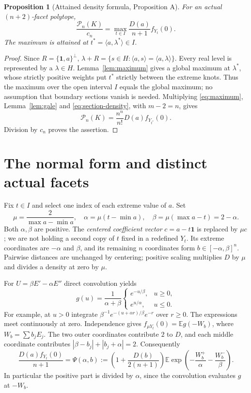 \documentclass[11pt]{article}
\newtheorem{proposition}[theorem]{Proposition}
\theoremstyle{remark}\newtheorem{remark}[theorem]{Remark}
\newcommand{\E}{\mathbb E}
\newcommand{\one}{\mathbf 1}
\newcommand{\PP}{\mathcal P}
\numberwithin{equation}{section}
\begin{document}
\begin{proposition}[Attained density formula, Proposition A]\label{prop:A}
For an actual $(n+2)$-facet polytope,
\begin{equation}\label{eq:A}
 \frac{\PP_n(K)}{c_n}
 =\max_{t\in I}\frac{D(a)}{n+1}f_{Y_t}(0).
\end{equation}
The maximum is attained at $t^*=\langle a,\lambda^*\rangle\in I$.
\end{proposition}
\begin{proof}
Since $R=\{\one,a\}^\perp$,
$\lambda+R=\{s\in H:\langle a,s\rangle=\langle a,\lambda\rangle\}$.
Every real level is represented by a $\lambda\in H$.
Lemma~\ref{lem:maximum} gives a global maximum at $\lambda^*$, whose
strictly positive weights put $t^*$ strictly between the extreme knots.
Thus the maximum over the open interval $I$ equals the global maximum;
no assumption that boundary sections vanish is needed.
Multiplying \eqref{eq:maximum}, Lemma~\ref{lem:gale} and
\eqref{eq:section-density}, with $m-2=n$, gives
\[
 \PP_n(K)=\frac{n^n}{n!}D(a)f_{Y_{t^*}}(0).
\]
Division by $c_n$ proves the assertion.
\end{proof}

\section{The normal form and distinct actual facets}\label{sec:normal}
Fix $t\in I$ and select one index of each extreme value of $a$.
Set
\[
 \mu=\frac2{\max a-\min a},\quad
 \alpha=\mu(t-\min a),\quad \beta=\mu(\max a-t)=2-\alpha.
\]
Both $\alpha,\beta$ are positive. The \emph{centered coefficient vector}
$c=a-t\one$ is replaced by $\mu c$; we are not holding a second copy of
$t$ fixed in a redefined $Y_t$. Its extreme coordinates are $-\alpha$
and $\beta$, and its remaining $n$ coordinates form
$b\in[-\alpha,\beta]^n$. Pairwise distances are unchanged by centering;
positive scaling multiplies $D$ by $\mu$ and divides a density at zero
by $\mu$.

For $U=\beta E'-\alpha E''$ direct convolution yields
\begin{equation}\label{eq:laplace-density}
 g(u)=\frac1{\alpha+\beta}
 \begin{cases}e^{-u/\beta},&u\ge0,\\e^{u/\alpha},&u\le0.\end{cases}
\end{equation}
For example, at $u>0$ integrate
$\beta^{-1}e^{-(u+\alpha r)/\beta}e^{-r}$ over $r\ge0$.
The expressions meet continuously at zero. Independence gives
$f_{\mu Y_t}(0)=\E g(-W_b)$, where $W_b=\sum b_jE_j$.
The two outer coordinates contribute $2$ to $D$, and each middle
coordinate contributes $|\beta-b_j|+|b_j+\alpha|=2$.
Consequently
\begin{equation}\label{eq:normal}
 \frac{D(a)f_{Y_t}(0)}{n+1}
 =\Psi(\alpha,b):=
 \left(1+\frac{D(b)}{2(n+1)}\right)
 \E\exp\left(-\frac{W_b^+}{\alpha}-\frac{W_b^-}{\beta}\right).
\end{equation}
In particular the positive part is divided by $\alpha$, since the
convolution evaluates $g$ at $-W_b$.
\end{document}
